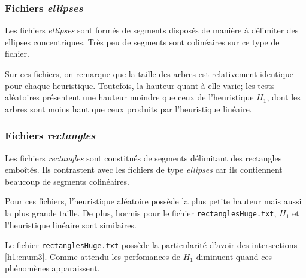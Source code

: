 \subsubsection*{Fichiers \og\emph{ellipses}\fg}
Les fichiers \og\emph{ellipses}\fg{} sont formés de segments disposés de manière
à délimiter des ellipses concentriques. Très peu de segments
sont colinéaires sur ce type de fichier.

Sur ces fichiers, on remarque que la taille des arbres
est relativement identique pour chaque heuristique.
Toutefois, la hauteur quant à elle varie; les tests aléatoires présentent
une hauteur moindre que ceux de l'heuristique $H_1$, dont les arbres
sont moins haut que ceux produits par l'heuristique linéaire.

\subsubsection*{Fichiers \og\emph{rectangles}\fg}
Les fichiers \og\emph{rectangles}\fg{} sont constitués de segments
délimitant des rectangles emboîtés. Ils contrastent avec les fichiers
de type \og\emph{ellipses}\fg{} car ils contiennent beaucoup de segments
colinéaires.

Pour ces fichiers, l'heuristique aléatoire possède
la plus petite hauteur mais aussi la plus grande taille.
De plus, hormis pour le fichier \texttt{rectanglesHuge.txt}, $H_1$
et l'heuristique linéaire sont similaires.

Le fichier \texttt{rectanglesHuge.txt} possède la particularité d'avoir des
intersections \ref{h1:enum3}. Comme attendu les perfomances de $H_1$
diminuent quand ces phénomènes apparaissent.

